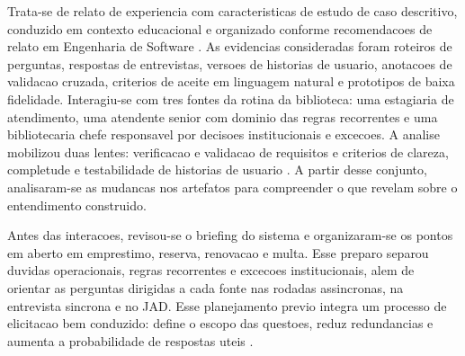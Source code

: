 ﻿\documentclass[12pt]{article}
\begin{document}
%
%
%
Trata-se de relato de experiencia com caracteristicas de estudo de caso descritivo, conduzido em contexto educacional e organizado conforme recomendacoes de relato em Engenharia de Software \cite{runeson2009guidelines}. As evidencias consideradas foram roteiros de perguntas, respostas de entrevistas, versoes de historias de usuario, anotacoes de validacao cruzada, criterios de aceite em linguagem natural e prototipos de baixa fidelidade. Interagiu-se com tres fontes da rotina da biblioteca: uma estagiaria de atendimento, uma atendente senior com dominio das regras recorrentes e uma bibliotecaria chefe responsavel por decisoes institucionais e excecoes. A analise mobilizou duas lentes: verificacao e validacao de requisitos \cite{sakthivel1991verification} e criterios de clareza, completude e testabilidade de historias de usuario \cite{lucassen2016qus}. A partir desse conjunto, analisaram-se as mudancas nos artefatos para compreender o que revelam sobre o entendimento construido.

%
Antes das interacoes, revisou-se o briefing do sistema e organizaram-se os pontos em aberto em emprestimo, reserva, renovacao e multa. Esse preparo separou duvidas operacionais, regras recorrentes e excecoes institucionais, alem de orientar as perguntas dirigidas a cada fonte nas rodadas assincronas, na entrevista sincrona e no JAD. Esse planejamento previo integra um processo de elicitacao bem conduzido: define o escopo das questoes, reduz redundancias e aumenta a probabilidade de respostas uteis \cite{hickey2004unified}.
\end{document}
